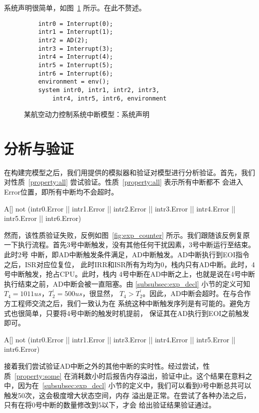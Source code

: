 系统声明很简单，如图~\ref{fig:exp_model_decl} 所示。在此不赘述。

\begin{figure}[H]
	\centering
	\begin{lstlisting}
	intr0 = Interrupt(0);
	intr1 = Interrupt(1);
	intr2 = AD(2);
	intr3 = Interrupt(3);
	intr4 = Interrupt(4);
	intr5 = Interrupt(5);
	intr6 = Interrupt(6);
	environment = env();
	system intr0, intr1, intr2, intr3, 
		intr4, intr5, intr6, environment
	\end{lstlisting}
	\caption{某航空动力控制系统中断模型：系统声明}
	\label{fig:exp_model_decl}
\end{figure}

\section{分析与验证}
\label{sec:experiment}

在构建完模型之后，我们用\uppaal 提供的模拟器和验证对模型进行分析验证。首先，我们
对性质~\ref{property:all} 尝试验证。性质~\ref{property:all} 表示所有中断都不
会进入Error位置，即所有中断均不会超时。

\begin{property}
	A[] not (intr0.Error || intr1.Error || intr2.Error || intr3.Error 
	|| intr4.Error || intr5.Error || intr6.Error) 
	\label{property:all}
\end{property}

然而，该性质验证失败，反例如图~\ref{fig:exp_counter} 所示。我们跟随该反例复原
一下执行流程。首先3号中断触发，没有其他任何干扰因素，3号中断运行至结束。此时2号
中断，即AD中断触发条件满足，AD中断触发。AD中断执行到EOI指令之后，ISR对应位复位，
此时IRR和ISR所有为均为0，栈内只有AD中断。此时，4号中断触发，抢占CPU。此时，栈内
4号中断在AD中断之上，也就是说在4号中断执行结束之前，AD中断会被一直阻塞。由
\ref{subsubsec:exp_decl} 小节的定义可知$T_4=1011us$，$T^\prime_2=500us$，很显然，
$T_4>T^\prime_2$。因此，AD中断会超时。在与合作方工程师交流之后，我们一致认为在
系统这种中断触发序列是有可能的。避免方式也很简单，只要将4号中断的触发时机提前，
保证其在AD执行到EOI之前触发即可。

\begin{property}
	A[] not (intr0.Error || intr1.Error || intr3.Error || intr4.Error || 
	intr5.Error || intr6.Error) 
	\label{property:some}
\end{property}

接着我们尝试验证AD中断之外的其他中断的实时性。经过尝试，性质~\ref{property:some}
在消耗数小时后报告内存溢出，验证中止。这个结果在意料之中，因为在~\ref{subsubsec:exp_decl} 
小节的定义中，我们可以看到0号中断总共可以触发50次，这会极度增大状态空间，内存
溢出是正常。在尝试了各种办法之后，只有在将0号中断的数量修改到5以下，\uppaal 才会
给出验证结果\pozhehao 验证通过。

